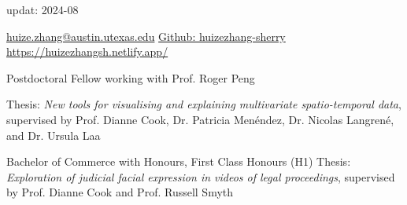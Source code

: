 \documentclass[10pt,a4paper]{article} %
\begin{document}
 


\begin{CJK}{UTF8}{gbsn}
\end{CJK}
\hfill
updat: 2024-08
\spacedhrule{0.2em}{-0.4em} %

\vspace{0.25cm}
\noindent
\href{mailto:huize.zhang@austin.utexas.edu}{huize.zhang@austin.utexas.edu}
\hspace{4em}
\href{https://github.com/huizezhang-sherry/}{Github: huizezhang-sherry}
\hfill
\href{https://huizezhangsh.netlify.app/}{https://huizezhangsh.netlify.app/}




    {Postdoctoral Fellow working with Prof. Roger Peng
    }

    {Thesis: \textit{New tools for visualising and explaining multivariate spatio-temporal data},
    supervised by Prof. Dianne Cook, Dr. Patricia Men\'endez, Dr. Nicolas Langren\'e, and Dr. Ursula Laa 
    }

    {Bachelor of Commerce with Honours, First Class Honours (H1) \newline
    Thesis: \textit{Exploration of judicial facial expression in videos of legal proceedings}, supervised by Prof. Dianne Cook and Prof. Russell Smyth
    }
\end{document}
